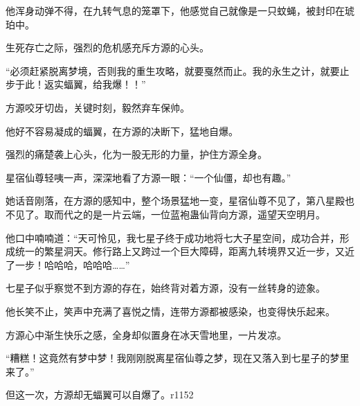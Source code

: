 \begin{this_body}
他浑身动弹不得，在九转气息的笼罩下，他感觉自己就像是一只蚊蝇，被封印在琥珀中。

生死存亡之际，强烈的危机感充斥方源的心头。

“必须赶紧脱离梦境，否则我的重生攻略，就要戛然而止。我的永生之计，就要止步于此！返实蝠翼，给我爆！！”

方源咬牙切齿，关键时刻，毅然弃车保帅。

他好不容易凝成的蝠翼，在方源的决断下，猛地自爆。

强烈的痛楚袭上心头，化为一股无形的力量，护住方源全身。

星宿仙尊轻咦一声，深深地看了方源一眼：“一个仙僵，却也有趣。”

她话音刚落，在方源的感知中，整个场景猛地一变，星宿仙尊不见了，第八星殿也不见了。取而代之的是一片云端，一位蓝袍蛊仙背向方源，遥望天空明月。

他口中喃喃道：“天可怜见，我七星子终于成功地将七大子星空间，成功合并，形成统一的繁星洞天。修行路上又跨过一个巨大障碍，距离九转境界又近一步，又近了一步！哈哈哈，哈哈哈……”

七星子似乎察觉不到方源的存在，始终背对着方源，没有一丝转身的迹象。

他长笑不止，笑声中充满了喜悦之情，连带方源都被感染，也变得快乐起来。

方源心中渐生快乐之感，全身却似置身在冰天雪地里，一片发凉。

“糟糕！这竟然有梦中梦！我刚刚脱离星宿仙尊之梦，现在又落入到七星子的梦里来了。”

但这一次，方源却无蝠翼可以自爆了。r1152

\end{this_body}

